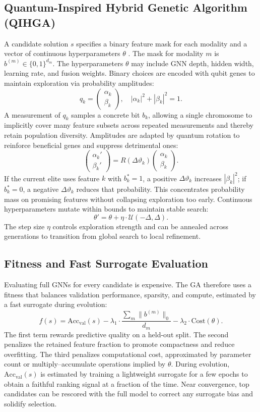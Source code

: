 \documentclass[11pt,a4paper]{article}
\begin{document}
\subsection{Quantum-Inspired Hybrid Genetic Algorithm (QIHGA)}
A candidate solution $s$ specifies a binary feature mask for each modality and a vector of continuous hyperparameters $\theta$ \citep{ref15}. The mask for modality $m$ is $b^{(m)} \in \{0,1\}^{d_m}$. The hyperparameters $\theta$ may include GNN depth, hidden width, learning rate, and fusion weights. Binary choices are encoded with qubit genes to maintain exploration via probability amplitudes:
\[
q_k = \begin{pmatrix} \alpha_k \\ \beta_k \end{pmatrix}, \quad |\alpha_k|^2 + |\beta_k|^2 = 1.
\]
A measurement of $q_k$ samples a concrete bit $b_k$, allowing a single chromosome to implicitly cover many feature subsets across repeated measurements and thereby retain population diversity. Amplitudes are adapted by quantum rotation to reinforce beneficial genes and suppress detrimental ones:
\[
\begin{pmatrix} \alpha_k' \\ \beta_k' \end{pmatrix} = R(\Delta \vartheta_k) \begin{pmatrix} \alpha_k \\ \beta_k \end{pmatrix}.
\]
If the current elite uses feature $k$ with $b_k^* = 1$, a positive $\Delta \vartheta_k$ increases $|\beta_k|^2$; if $b_k^* = 0$, a negative $\Delta \vartheta_k$ reduces that probability. This concentrates probability mass on promising features without collapsing exploration too early. Continuous hyperparameters mutate within bounds to maintain stable search:
\[
\theta' = \theta + \eta \cdot \mathcal{U}(-\Delta, \Delta).
\]
The step size $\eta$ controls exploration strength and can be annealed across generations to transition from global search to local refinement.

\subsection{Fitness and Fast Surrogate Evaluation}
Evaluating full GNNs for every candidate is expensive. The GA therefore uses a fitness that balances validation performance, sparsity, and compute, estimated by a fast surrogate during evolution:
\[
f(s) = \text{Acc}_\text{val}(s) - \lambda_1 \cdot \frac{\sum_m \|b^{(m)}\|_0}{d_m} - \lambda_2 \cdot \text{Cost}(\theta).
\]
The first term rewards predictive quality on a held-out split. The second penalizes the retained feature fraction to promote compactness and reduce overfitting. The third penalizes computational cost, approximated by parameter count or multiply--accumulate operations implied by $\theta$. During evolution, $\text{Acc}_\text{val}(s)$ is estimated by training a lightweight surrogate for a few epochs to obtain a faithful ranking signal at a fraction of the time. Near convergence, top candidates can be rescored with the full model to correct any surrogate bias and solidify selection.
\end{document}
